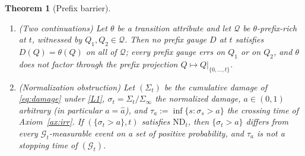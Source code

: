 \documentclass[11pt]{article}
\theoremstyle{plain}
\newtheorem{theorem}{Theorem}[section]
\theoremstyle{definition}
\theoremstyle{remark}
\begin{document}
\begin{theorem}[Prefix barrier]\label{thm:nogo3}
\begin{enumerate}[label=(\roman*),leftmargin=2.2em]
\item \emph{(}Two continuations\emph{)} Let $\theta$ be a transition attribute and let $\mathcal Q$ be $\theta$-prefix-rich at $t$, witnessed by $Q_1,Q_2\in\mathcal Q$. Then no prefix gauge $D$ at $t$ satisfies $D(Q)=\theta(Q)$ on all of $\mathcal Q$; every prefix gauge errs on $Q_1$ or on $Q_2$, and $\theta$ does not factor through the prefix projection $Q\mapsto Q|_{\{0,\dots,t\}}$.
\item \emph{(}Normalization obstruction\emph{)} Let $(\Sigma_t)$ be the cumulative damage of \eqref{eq:damage} under \ref{L1}, $\sigma_t=\Sigma_t/\Sigma_\infty$ the normalized damage, $a\in(0,1)$ arbitrary (in particular $a=\hat a$), and $\tau_a:=\inf\{s:\sigma_s>a\}$ the crossing time of Axiom~\ref{ax:irr}. If $(\{\sigma_t>a\},t)$ satisfies $\mathrm{ND}_t$, then $\{\sigma_t>a\}$ differs from every $\mathcal G_t$-measurable event on a set of positive probability, and $\tau_a$ is not a stopping time of $(\mathcal G_t)$.
\end{enumerate}
\end{theorem}
\end{document}
